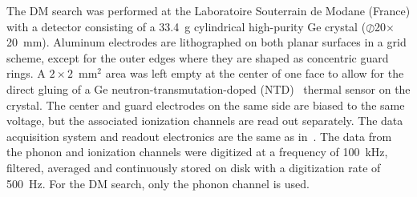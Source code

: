 \documentclass[aps,nofootinbib,floatfix,showpacs,preprintnumbers,twocolumn,superscriptaddress]{revtex4}
\begin{document}
The DM search was performed at the Laboratoire Souterrain de Modane (France) with a detector consisting of a 33.4~g cylindrical high-purity Ge crystal ($\oslash$20$\times$20~mm). Aluminum electrodes are lithographed on both planar surfaces in a grid scheme, except for the outer edges where they are shaped as concentric guard rings. 
A $2\times2$~$\mathrm{mm^2}$ area was left empty at the center of one face to allow for the direct gluing of a Ge neutron-transmutation-doped (NTD)~\cite{NTD} thermal sensor on the crystal. The center and guard electrodes on the same side are biased to the same voltage, but the associated ionization channels are read out separately. The data acquisition system and readout electronics are the same as in~\cite{edwtech}.
The data from the phonon and ionization channels were digitized at a frequency of 100~kHz, filtered, averaged and continuously stored on disk with a digitization rate of 500~Hz. For the DM search, only the phonon channel is used.
\end{document}
